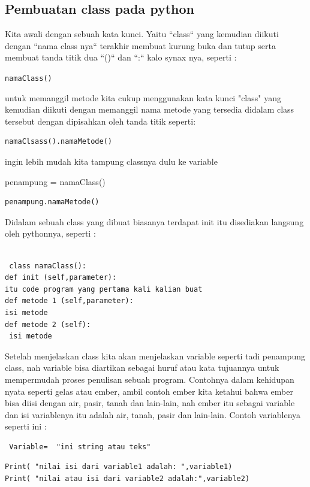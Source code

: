 \begin{enumerate}
\subsection{Pembuatan class pada python}
Kita awali dengan sebuah kata kunci. Yaitu ``class`` yang kemudian diikuti dengan ``nama class nya`` terakhir membuat kurung buka dan tutup serta membuat tanda titik dua  ``()`` dan ``:`` kalo synax nya, seperti :


\verb|namaClass()|

untuk memanggil metode kita cukup menggunakan kata kunci "class" yang kemudian diikuti dengan memanggil nama metode yang tersedia didalam class tersebut dengan dipisahkan oleh tanda titik seperti:
\begin{verbatim}
namaClsass().namaMetode()
\end{verbatim}
ingin lebih mudah kita tampung classnya dulu ke variable

penampung = namaClass()
\begin{verbatim}
penampung.namaMetode()
\end{verbatim}
Didalam sebuah class yang dibuat biasanya terdapat init itu disediakan langsung oleh pythonnya, seperti :


\begin{verbatim}

 class namaClass():
def init (self,parameter):
itu code program yang pertama kali kalian buat
def metode 1 (self,parameter):
isi metode
def metode 2 (self):
 isi metode

 \end{verbatim}

Setelah menjelaskan class kita akan menjelaskan variable seperti tadi penampung class, nah variable bisa diartikan sebagai huruf atau kata tujuannya untuk mempermudah proses penulisan sebuah program. Contohnya dalam kehidupan nyata seperti gelas atau ember, ambil contoh ember kita ketahui bahwa ember bisa diisi dengan air, pasir, tanah dan lain-lain, nah ember itu sebagai variable dan isi variablenya itu adalah air, tanah, pasir dan lain-lain.
Contoh variablenya seperti ini :

\begin{verbatim}
 Variable=  "ini string atau teks"
\end{verbatim}

\begin{verbatim}
Print( "nilai isi dari variable1 adalah: ",variable1)
Print( "nilai atau isi dari variable2 adalah:",variable2)
\end{verbatim}


\end{enumerate}
